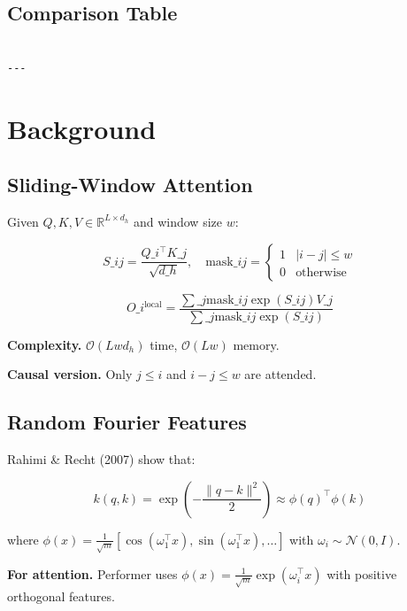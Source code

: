 \subsection{Comparison Table}

\begin{lstlisting}

---
\end{lstlisting}


\section{Background}

\subsection{Sliding-Window Attention}

Given $Q, K, V \in \mathbb{R}^{L \times d_h}$ and window size $w$:

\[
S\_{ij} = \frac{Q\_i^\top K\_j}{\sqrt{d\_h}}, \quad
\text{mask}\_{ij} = \begin{cases} 1 & |i - j| \leq w \\ 0 & \text{otherwise} \end{cases}
\tag{3.1}
\]

\[
O\_i^\text{local} = \frac{\sum\_j \text{mask}\_{ij} \exp(S\_{ij}) V\_j}{\sum\_j \text{mask}\_{ij} \exp(S\_{ij})}
\tag{3.2}
\]

\textbf{Complexity.} $\mathcal{O}(L w d_h)$ time, $\mathcal{O}(L w)$ memory.

\textbf{Causal version.} Only $j \le i$ and $i - j \leq w$ are attended.

\subsection{Random Fourier Features}

Rahimi \& Recht (2007) show that:

\[
k(q, k) = \exp\!\left(-\frac{\|q - k\|^2}{2}\right) \approx \phi(q)^\top \phi(k)
\tag{3.3}
\]

where $\phi(x) = \frac{1}{\sqrt{m}} \left[\cos(\omega_1^\top x), \sin(\omega_1^\top x), \ldots\right]$ 
with $\omega_i \sim \mathcal{N}(0, I)$.

\textbf{For attention.} Performer uses $\phi(x) = \frac{1}{\sqrt{m}} \exp(\omega_i^\top x)$ 
with positive orthogonal features.

